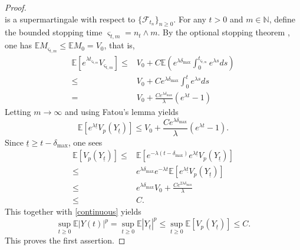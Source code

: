 \documentclass[preprint,12pt,compress]{elsarticle}
\begin{document}
\begin{proof}
\begin{equation*}
\end{equation*}
is a supermartingale with respect to ${\{ {\mathcal{F}_{{t_n}}}\} _{n \ge 0}}$. For any $t > 0$ and $m \in \mathbb{N}$, define the bounded stopping time ${\varsigma _{t,m}} = {n_t} \wedge m$. By the optional stopping theorem \cite[Theorem 7.14, p.~189]{klebaner2012introduction}, one has $\mathbb{E}{M_{{\varsigma _{t,m}} }} \le \mathbb{E}{M_0} = V_0$, that is,
\begin{equation*}
\begin{split}
	\mathbb{E}\left[ {{e^{\lambda {t_{{\varsigma _{t,m}}}}}}{V_{{\varsigma _{t,m}}}}} \right] 
	\le& V_0 + C\mathbb{E}\left( {{e^{\lambda {\delta _{\max }}}}\int_0^{{t_{{\varsigma _{t,m}}}}} {{e^{\lambda s}}ds} } \right) \\
	\le& V_0 + C{e^{\lambda {\delta _{\max }}}}\int_0^t {{e^{\lambda s}}ds}  \\
	=& V_0 + \frac{{C{e^{\lambda {\delta _{\max }}}}}}{\lambda }({e^{\lambda t}} - 1)
\end{split}
\end{equation*}
Letting $m \to \infty$ and using Fatou's lemma \cite[Theorem 2.6.2, p.~187]{shiryaev2019probability} yields
\begin{equation*}
	\mathbb{E}\left[ {{e^{\lambda {\underline{t}}}}V_p(Y_{\underline{t}})} \right] \le V_0 + \frac{{C{e^{\lambda {\delta _{\max }}}}}}{\lambda }({e^{\lambda t}} - 1).
\end{equation*}
Since $\underline{t} \ge t- \delta_{\max}$, one sees
\begin{equation*}
\begin{split}
	\mathbb{E}\left[ V_p(Y_{\underline{t}}) \right] \le& \mathbb{E}\left[ {{e^{ - \lambda (t - {\delta _{\max }})}}{e^{\lambda \underline{t}}}V_p({Y_{\underline{t}}})} \right] \\
	\le& {e^{\lambda {\delta _{\max }}}}{e^{ - \lambda t}}\mathbb{E}\left[ {{e^{\lambda \underline{t}}}V_p(Y_{\underline{t}})} \right] \\
	\le& {e^{\lambda {\delta _{\max }}}}V_0 + \frac{{C{e^{2\lambda {\delta _{\max }}}}}}{\lambda } \\
	\le& C .
\end{split}
\end{equation*}
This together with \eqref{continuous} yields
\begin{equation*}
	\mathop {\sup }\limits_{t \ge 0} \mathbb{E}{\left| {Y(t)} \right|^p} = \mathop {\sup }\limits_{t \ge 0} \mathbb{E}{\left| {{Y_{\underline{t}}}} \right|^p} \le \mathop {\sup }\limits_{t \ge 0} \mathbb{E}\left[ V_p(Y_{\underline{t}}) \right] \le C.
\end{equation*}
This proves the first assertion.


\end{proof}
\end{document}
